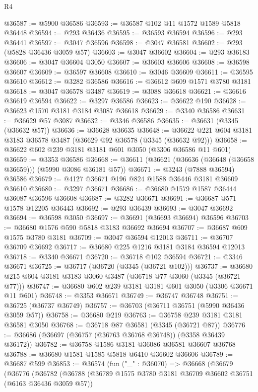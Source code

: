\begin{lexlean}{R4}
\begin{coremodule}
@36587 := @5900 @36586
@36593 := @36587 @102 @11 @1572 @1589 @5818 @36448
@36594 := @293 @36436
@36595 := @36593 @36594
@36596 := @293 @36441
@36597 := @3047 @36596
@36598 := @3047 @36581
@36602 := @293 (@5828 @36436 @3059 @57)
@36603 := @3047 @36602
@36604 := @293 @36183
@36606 := @3047 @36604 @3050
@36607 := @36603 @36606
@36608 := @36598 @36607
@36609 := @36597 @36608
@36610 := @3046 @36609
@36611 := @36595 @36610
@36612 := @3282 @36586
@36616 := @36612 @609 @1571 @3780 @3181
@36618 := @3047 @36578 @3487
@36619 := @3088 @36618
@36621 := @36616 @36619 @36594
@36622 := @3297 @36586
@36623 := @36622 @190
@36628 := @36623 @1570 @3181 @3184 @3087 @36618
@36629 := @3340 @36586
@36631 := @36629 @57 @3087
@36632 := @3346 @36586
@36635 := @36631 (@3345 (@36632 @57))
@36636 := @36628 @36635
@36648 := @36622 @221 @604 @3181 @3183 @36578 @3487 (@36629 @92 @36578 (@3345 (@36632 @92)))
@36658 := @36622 @602 @239 @3181 @3181 @601 @3050 (@3306 @36586 @11 @601)
@36659 := @3353 @36586
@36668 := @36611 (@36621 (@36636 (@36648 (@36658 @36659))) (@5990 @3086 @36181 @57))
@36671 := @3243 (@7888 @36594) @36586
@36679 := @4127 @36671 @196 @824 @1588 @36446 @3181 @36609 @36610
@36680 := @3297 @36671
@36686 := @36680 @1579 @1587 @36444 @36087 @36596 @36608
@36687 := @3282 @36671
@36691 := @36687 @571 @1578 @12205 @36443
@36692 := @293 @36439
@36693 := @3047 @36692
@36694 := @36598 @3050
@36697 := @36691 (@36693 @36694) @36596
@36703 := @36680 @1576 @590 @5818 @3183 @36692 @36694
@36707 := @36687 @609 @1575 @3780 @3181
@36709 := @3047 @36594 @12013
@36711 := @36707 @36709 @36692
@36717 := @36680 @225 @1216 @3181 @3184 @36594 @12013
@36718 := @3340 @36671
@36720 := @36718 @102 @36594
@36721 := @3346 @36671
@36725 := @36717 (@36720 (@3345 (@36721 @102)))
@36737 := @36680 @215 @604 @3181 @3183 @3060 @3487 (@36718 @77 @3060 (@3345 (@36721 @77)))
@36747 := @36680 @602 @239 @3181 @3181 @601 @3050 (@3306 @36671 @11 @601)
@36748 := @3353 @36671
@36749 := @36747 @36748
@36751 := @36725 (@36737 @36749)
@36757 := @36703 (@36711 @36751 (@5990 @36436 @3059 @57))
@36758 := @36680 @219
@36763 := @36758 @239 @3181 @3181 @36581 @3050
@36768 := @36718 @87 @36581 (@3345 (@36721 @87))
@36776 := @36686 (@36697 (@36757 (@36763 @36768 @36748)) (@3358 @36439 @36172))
@36782 := @36758 @1586 @3181 @36086 @36581 @36607 @36768
@36788 := @36680 @1581 @1585 @5818 @6410 @36602 @36606
@36789 := @36687 @599
@36853 := @36574
    (fun ("_" : @36070) =>
    @36668
      (@36679
        (@36776
          (@36782
            (@36788
              (@36789 @1575 @3780 @3181 @36709 @36602 @36751 (@6163 @36436 @3059 @57))

\end{coremodule}
\end{lexlean}
